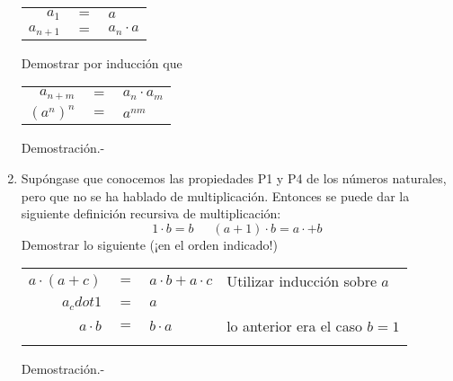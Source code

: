 \begin{enumerate}
\begin{center}
             \begin{tabular}{rcl}
                $a_1$&$=$&$a$\\
                $a_{n+1}$&$=$&$a_n \cdot a$\\
             \end{tabular}
          \end{center}
          Demostrar por inducción que
          \begin{center}
             \begin{tabular}{rcl}
                $a_{n+m}$&$=$&$a_n \cdot a_m$\\
                $(a^n)^n$&$=$&$a^{nm}$\\
             \end{tabular}
          \end{center}
          Demostración.-\;

       \item Supóngase que conocemos las propiedades P1 y P4 de los números naturales, pero que no se ha hablado de multiplicación. Entonces se puede dar la siguiente definición recursiva de multiplicación: $$1\cdot b=b\,\,\,\,\,\,\,\,\, (a+1)\cdot b =a\cdot +b$$
          Demostrar lo siguiente (¡en el orden indicado!)
          \begin{center}
             \begin{tabular}{rcll}
                $a\cdot (a+c)$&$=$&$a\cdot b + a\cdot c$&Utilizar inducción sobre $a$\\
                $a_cdot 1$&$=$&$a$&\\
                $a \cdot b$&$=$&$b\cdot a$&lo anterior era el caso $b=1$\\\\
             \end{tabular}
          \end{center}
          Demostración.-\;


\end{enumerate}
